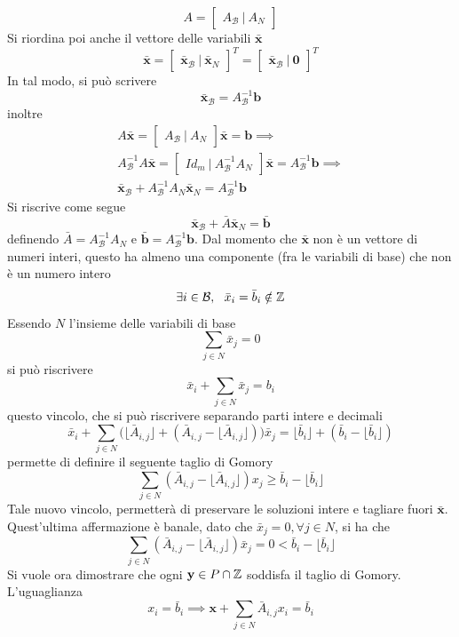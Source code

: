 \documentclass[10pt, letterpaper]{report}
\newcommand{\bb}{{\mathbf{b}}}
\newcommand{\x}{{\mathbf{x}}}
\newcommand{\y}{{\mathbf{y}}}
\begin{document}
$$ A=\begin{bmatrix}
    A_{\mathcal B} \ | \ A_N
\end{bmatrix}$$
Si riordina poi anche il vettore delle variabili $\bar\x$
 $$\bar\x=\begin{bmatrix}
    \bar \x_{\mathcal B} \ | \  \bar \x_{N}
 \end{bmatrix}^T=\begin{bmatrix}
    \bar \x_{\mathcal B} \ | \  \mathbf 0
 \end{bmatrix}^T$$
 In tal modo, si può scrivere $$ \bar\x_{\mathcal B}=A^{-1}_{\mathcal B}\bb$$
 inoltre 
 \begin{eqnarray*}
    A\bar\x=\begin{bmatrix}
    A_{\mathcal B} \ | \ A_N
\end{bmatrix}\bar\x=\bb\implies \\ 
A^{-1}_{\mathcal B}A\bar\x = \begin{bmatrix}
    Id_m \ | \ A^{-1}_{\mathcal B}A_N
\end{bmatrix}\bar\x = A^{-1}_{\mathcal B}\bb \implies \\
\bar\x_{\mathcal B}+A_{\mathcal B}^{-1}A_N\bar\x_N=A^{-1}_{\mathcal B}\bb
 \end{eqnarray*}
Si riscrive come segue 
$$ 
\bar\x_{\mathcal B}+\bar A\bar\x_N=\bar\bb$$
definendo $\bar A = A_{\mathcal B}^{-1}A_N$ e $\bar\bb=A^{-1}_{\mathcal B}\bb$.
Dal momento che $\bar\x$ non è un vettore di numeri interi, questo ha almeno una componente (fra le variabili di base) che non è un numero intero
$$ \exists i \in \mathcal B, \ \ \bar x_i = \bar b_i\notin{\mathbb Z}$$
Essendo $N$ l'insieme delle variabili di base 
$$ \sum_{j\in N}\bar x_j = 0$$
si può riscrivere 
$$ \bar x_i + \sum_{j\in N}\bar x_j = b_i$$
questo vincolo, che si può riscrivere separando parti intere e decimali
$$ \bar x_i + \sum_{j\in N}\Big(  \lfloor\bar A_{i,j}\rfloor + (\bar A_{i,j}-\lfloor\bar A_{i,j}\rfloor) \Big)\bar x_j = \lfloor\bar b_i\rfloor + (\bar b_i-\lfloor\bar b_i\rfloor)$$
permette di definire il seguente taglio di Gomory 
$$ 
\sum_{j\in N} (\bar A_{i,j}-\lfloor\bar A_{i,j}\rfloor)x_j \ge \bar b_i-\lfloor\bar b_i\rfloor
$$
Tale nuovo vincolo, permetterà di preservare le soluzioni intere e tagliare fuori $\bar \x$. Quest'ultima affermazione è banale, dato che $\bar x_j = 0, \forall j \in N$, si ha che  
$$ 
\sum_{j\in N} (\bar A_{i,j}-\lfloor\bar A_{i,j}\rfloor)\bar x_j = 0 < \bar b_i-\lfloor\bar b_i\rfloor
$$
Si vuole ora dimostrare che ogni $\y \in P\cap \Z$ soddisfa il taglio di Gomory. L'uguaglianza 
$$ x_i=\bar b_i\implies \x+\sum_{j\in N}\bar A_{i,j}x_i=\bar b_i$$
\end{document}
